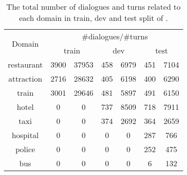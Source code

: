 \begin{table}[t]
\caption{\label{tbl:multiwoz-remix} The total number of dialogues and
  turns related to each domain in train, dev and test split of \multiwoz.}
\begin{center}{
\setlength{\tabcolsep}{3pt}
\begin{tabular}{ccccccc}
 \toprule
\hline
\multirow{2}{*}{Domain } & \multicolumn{6}{c}{\#dialogues/\#turns}                                                \\ \cmidrule{2-7}
                         & \multicolumn{2}{c}{ train } & \multicolumn{2}{c}{ dev } & \multicolumn{2}{c}{ test } \\ \hline
restaurant               & 3900                        & 37953                     & 458 & 6979 & 451 & 7104    \\
attraction               & 2716                        & 28632                     & 405 & 6198 & 400 & 6290    \\
train                    & 3001                        & 29646                     & 481 & 5897 & 491 & 6150    \\
hotel                    & 0                           & 0                         & 737 & 8509 & 718 & 7911    \\
taxi                     & 0                           & 0                         & 374 & 2692 & 364 & 2659    \\
hospital                 & 0                           & 0                         & 0   & 0    & 287 & 766     \\
police                   & 0                           & 0                         & 0   & 0    & 252 & 475     \\
bus                      & 0                           & 0                         & 0   & 0    & 6   & 132     \\
 \hline
 \bottomrule
\end{tabular}}
\end{center}
\end{table}

